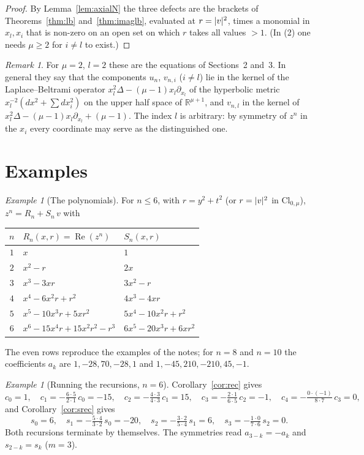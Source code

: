 \documentclass[11pt,a4paper]{article}
\DeclareMathOperator{\Real}{Re}
\newcommand{\R}{\mathbb{R}}
\DeclarePairedDelimiter{\abs}{\lvert}{\rvert}
\theoremstyle{remark}
\newtheorem{remark}[theorem]{Remark}
\newtheorem{example}[theorem]{Example}
\begin{document}
\begin{proof}
By Lemma~\ref{lem:axialN} the three defects are the brackets of Theorems~\ref{thm:lb}
and~\ref{thm:imaglb}, evaluated at $r=\abs{v}^2$, times a monomial in $x_l,x_i$ that is non-zero
on an open set on which $r$ takes all values $>1$. (In (2) one needs $\mu\ge2$ for $i\ne l$ to exist.)
\end{proof}

\begin{remark}
For $\mu=2$, $l=2$ these are the equations of Sections~2 and~3. In general they say that the
components $u_n$, $v_{n,i}$ ($i\ne l$) lie in the kernel of the Laplace--Beltrami operator
$x_l^2\Delta-(\mu-1)x_l\partial_{x_l}$ of the hyperbolic metric $x_l^{-2}(dx^2+\sum dx_i^2)$ on
the upper half space of $\R^{\mu+1}$, and $v_{n,l}$ in the kernel of
$x_l^2\Delta-(\mu-1)x_l\partial_{x_l}+(\mu-1)$. The index $l$ is arbitrary: by symmetry of $z^n$
in the $x_i$ every coordinate may serve as the distinguished one.
\end{remark}

\section{Examples}

\begin{example}[The polynomials]\label{ex:table}
For $n\le 6$, with $r=y^2+t^2$ (or $r=\abs{v}^2$ in $\mathrm{Cl}_{0,\mu}$), $z^n=R_n+S_n\,v$ with
\begin{center}
\renewcommand{\arraystretch}{1.15}
\begin{tabular}{@{}cll@{}}
  $n$ & $R_n(x,r)=\Real(z^n)$ & $S_n(x,r)$\\\hline
  $1$ & $x$ & $1$\\
  $2$ & $x^2-r$ & $2x$\\
  $3$ & $x^3-3xr$ & $3x^2-r$\\
  $4$ & $x^4-6x^2r+r^2$ & $4x^3-4xr$\\
  $5$ & $x^5-10x^3r+5xr^2$ & $5x^4-10x^2r+r^2$\\
  $6$ & $x^6-15x^4r+15x^2r^2-r^3$ & $6x^5-20x^3r+6xr^2$
\end{tabular}
\end{center}
The even rows reproduce the examples of the notes; for $n=8$ and $n=10$ the coefficients
$a_k$ are $1,-28,70,-28,1$ and $1,-45,210,-210,45,-1$.
\end{example}

\begin{example}[Running the recursions, $n=6$]
Corollary~\ref{cor:rec} gives
\[
  c_0=1,\quad c_1=-\tfrac{6\cdot5}{2\cdot1}\,c_0=-15,\quad
  c_2=-\tfrac{4\cdot3}{4\cdot3}\,c_1=15,\quad
  c_3=-\tfrac{2\cdot1}{6\cdot5}\,c_2=-1,\quad c_4=-\tfrac{0\cdot(-1)}{8\cdot7}\,c_3=0,
\]
and Corollary~\ref{cor:srec} gives
\[
  s_0=6,\quad s_1=-\tfrac{5\cdot4}{3\cdot2}\,s_0=-20,\quad
  s_2=-\tfrac{3\cdot2}{5\cdot4}\,s_1=6,\quad s_3=-\tfrac{1\cdot0}{7\cdot6}\,s_2=0 .
\]
Both recursions terminate by themselves. The symmetries read $a_{3-k}=-a_k$ and
$s_{2-k}=s_k$ ($m=3$).
\end{example}
\end{document}
